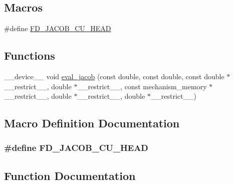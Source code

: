 \subsection*{Macros}
\begin{DoxyCompactItemize}
\item 
\#define \hyperlink{fd__jacob_8cuh_a8c04292c7243648197f5d86f968751d4}{F\+D\+\_\+\+J\+A\+C\+O\+B\+\_\+\+C\+U\+\_\+\+H\+E\+AD}
\end{DoxyCompactItemize}
\subsection*{Functions}
\begin{DoxyCompactItemize}
\item 
\+\_\+\+\_\+device\+\_\+\+\_\+ void \hyperlink{fd__jacob_8cuh_ae6506bc13e5e14169a45e3a48846da16}{eval\+\_\+jacob} (const double, const double, const double $\ast$\+\_\+\+\_\+restrict\+\_\+\+\_\+, double $\ast$\+\_\+\+\_\+restrict\+\_\+\+\_\+, const mechanism\+\_\+memory $\ast$\+\_\+\+\_\+restrict\+\_\+\+\_\+, double $\ast$\+\_\+\+\_\+restrict\+\_\+\+\_\+, double $\ast$\+\_\+\+\_\+restrict\+\_\+\+\_\+)
\end{DoxyCompactItemize}


\subsection{Macro Definition Documentation}
\subsubsection[{\texorpdfstring{F\+D\+\_\+\+J\+A\+C\+O\+B\+\_\+\+C\+U\+\_\+\+H\+E\+AD}{FD_JACOB_CU_HEAD}}]{\setlength{\rightskip}{0pt plus 5cm}\#define F\+D\+\_\+\+J\+A\+C\+O\+B\+\_\+\+C\+U\+\_\+\+H\+E\+AD}\hypertarget{fd__jacob_8cuh_a8c04292c7243648197f5d86f968751d4}{}\label{fd__jacob_8cuh_a8c04292c7243648197f5d86f968751d4}


\subsection{Function Documentation}
